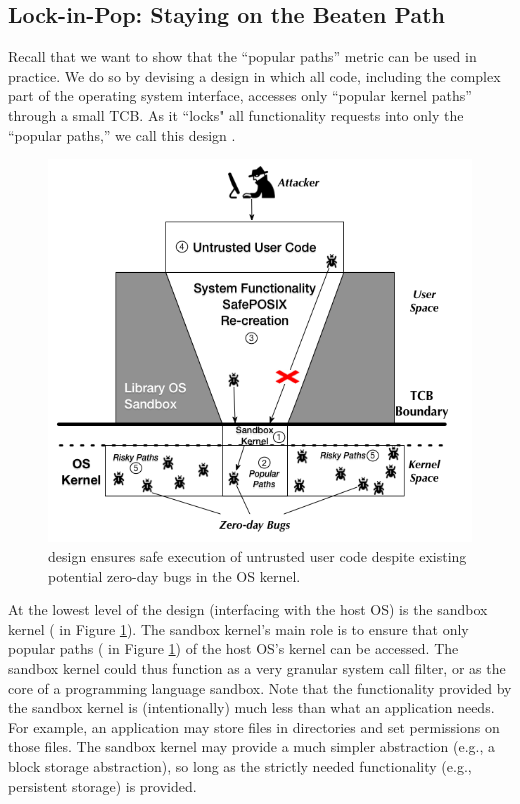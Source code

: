 \subsection{Lock-in-Pop: Staying on the Beaten Path}
\label{lock-in-pop}

Recall that we want to show that the ``popular paths'' metric can be used in practice.
We do so by devising a design
in which all code, including the complex part
of the operating system interface, accesses only
``popular kernel paths'' through a small TCB. As it ``locks" all functionality
requests into only the ``popular paths,'' we call this design \lip.

\begin{figure}%
\centering
\includegraphics[width=1.0\columnwidth]{diagram/Virtualization_Design_Model_01.png}
\caption{\small \lip design ensures safe execution of untrusted user code
despite existing potential zero-day bugs in the OS kernel.}
\label{fig:design_safe_reimplementation}
\end{figure}

At the lowest level of the design (interfacing with the host OS) is the
sandbox kernel ( in Figure \ref{fig:design_safe_reimplementation}).
The sandbox kernel's main role is to ensure that only popular paths ( in Figure \ref{fig:design_safe_reimplementation})
of the host OS's kernel can be accessed.
The sandbox kernel could thus function as a very granular system call filter, or
as the core of a programming language sandbox. Note that the functionality
provided by the sandbox kernel is (intentionally) much less than what
an application needs. For example, an application may store files in directories and set permissions on those files.
The sandbox kernel may provide a much simpler abstraction (e.g., a block storage abstraction),
so long as the strictly needed functionality (e.g., persistent storage) is provided.


